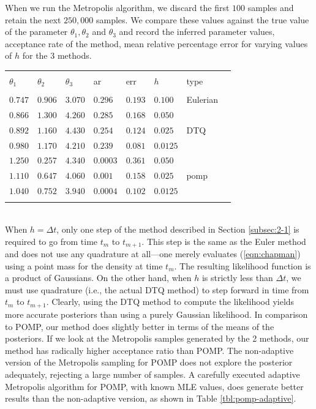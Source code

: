 \documentclass[graybox]{svmult}
\begin{document}
When we run the Metropolis algorithm, we discard the first $100$ samples and retain the next $250,000$ samples. We compare these values against the true value of the parameter $\theta_1, \theta_2$ and $\theta_3$ and record the inferred parameter values, acceptance rate of the method, mean relative percentage error for varying values of $h$ for the 3 methods.
\vspace{-4mm}
\setlength{\tabcolsep}{8pt}
\begin{table}[] \centering 
\begin{tabular}{llllllll} 
\\[-1.8ex]\hline 
\hline \\[-1.8ex] 
$\theta_1$ & $\theta_2$ & $\theta_3$ & ar & err & $h$ & type \\ 
\hline \\[-1.8ex] 
$0.747$ & $0.906$ & $3.070$ & $0.296$ & $0.193$ & $0.100$ & Eulerian \\ \hline
$0.866$ & $1.300$ & $4.260$ & $0.285$ & $0.168$ & $0.050$ &  \\ 
$0.892$ & $1.160$ & $4.430$ & $0.254$ & $0.124$ & $0.025$ & DTQ \\ 
$0.980$ & $1.170$ & $4.210$ & $0.239$ & $0.081$ & $0.0125$ &  \\ \hline
$1.250$ & $0.257$ & $4.340$ & $0.0003$ & $0.361$ & $0.050$ &  \\ 
$1.110$ & $0.647$ & $4.060$ & $0.001$ & $0.158$ & $0.025$ & pomp \\ 
$1.040$ & $0.752$ & $3.940$ & $0.0004$ & $0.102$ & $0.0125$ &  \\ 
\hline \\[-1.8ex] 
\end{tabular} 
\end{table} 
\vspace{-5mm}
\\
When $h = \Delta t$, only one step of the method described in Section
\ref{subsec:2-1} is required to go from time $t_m$ to $t_{m+1}$. This
step is the same as the Euler method and does not use any quadrature at all---one merely evaluates (\ref{eqn:chapman}) using a point mass for the density at time $t_m$. The resulting likelihood function is a product of Gaussians. On the other hand, when $h$ is strictly less than $\Delta t$, we must use quadrature (i.e., the actual DTQ method) to step forward in time from $t_m$ to $t_{m+1}$. Clearly, using the DTQ method to compute the likelihood yields more accurate posteriors than using a purely Gaussian likelihood. In comparison to POMP, our method does slightly better in terms of the means of the posteriors. If we look at the Metropolis samples generated by the 2 methods, our method has radically higher acceptance ratio than POMP. The non-adaptive version of the Metropolis sampling for POMP does not explore the posterior adequately, rejecting a large number of samples. A carefully executed adaptive Metropolis algorithm for POMP, with known MLE values, does generate better results than the non-adaptive version, as shown in Table \ref{tbl:pomp-adaptive}.
\end{document}
